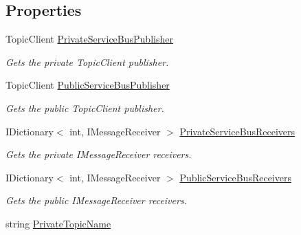 \subsection*{Properties}
\begin{DoxyCompactItemize}
\item 
Topic\+Client \hyperlink{classCqrs_1_1Azure_1_1ServiceBus_1_1AzureServiceBus_a640c513528e0037de1813d134e4d0476_a640c513528e0037de1813d134e4d0476}{Private\+Service\+Bus\+Publisher}
\begin{DoxyCompactList}\small\item\em Gets the private Topic\+Client publisher. \end{DoxyCompactList}\item 
Topic\+Client \hyperlink{classCqrs_1_1Azure_1_1ServiceBus_1_1AzureServiceBus_a17195f3c8e05ec37dfac37a8e9e1b089_a17195f3c8e05ec37dfac37a8e9e1b089}{Public\+Service\+Bus\+Publisher}
\begin{DoxyCompactList}\small\item\em Gets the public Topic\+Client publisher. \end{DoxyCompactList}\item 
I\+Dictionary$<$ int, I\+Message\+Receiver $>$ \hyperlink{classCqrs_1_1Azure_1_1ServiceBus_1_1AzureServiceBus_aabe85675218dd5d535459850fff1b322_aabe85675218dd5d535459850fff1b322}{Private\+Service\+Bus\+Receivers}
\begin{DoxyCompactList}\small\item\em Gets the private I\+Message\+Receiver receivers. \end{DoxyCompactList}\item 
I\+Dictionary$<$ int, I\+Message\+Receiver $>$ \hyperlink{classCqrs_1_1Azure_1_1ServiceBus_1_1AzureServiceBus_a6498253027d0f613f76e0b8c8112da1e_a6498253027d0f613f76e0b8c8112da1e}{Public\+Service\+Bus\+Receivers}
\begin{DoxyCompactList}\small\item\em Gets the public I\+Message\+Receiver receivers. \end{DoxyCompactList}\item 
string \hyperlink{classCqrs_1_1Azure_1_1ServiceBus_1_1AzureServiceBus_a7af8ebcdd25672ff2252085637904f82_a7af8ebcdd25672ff2252085637904f82}{Private\+Topic\+Name}

\end{DoxyCompactItemize}
